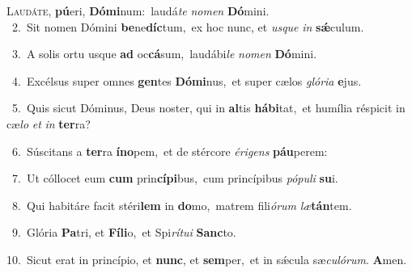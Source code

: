 \lettrine{\initial\textcolor{\initialcolor}{L}}{audáte,} \textbf{pú}\-eri, \textbf{Dó}\-\textbf{mi}num:~\star laudá\textit{te} \textit{no}\-\textit{men} \textbf{Dó}\-mini.\\
{\numbfont\textcolor{\numbcolor}{~2.}}~Sit nomen Dómini \textbf{be}\-ne\-\textbf{díc}\-tum,~\star ex hoc nunc, et \textit{us}\-\textit{que} \textit{in} \textbf{sǽ}\-culum.\par
{\numbfont\textcolor{\numbcolor}{~3.}}~A solis ortu usque \textbf{ad} oc\-\textbf{cá}\-sum,~\star laudábi\textit{le} \textit{no}\-\textit{men} \textbf{Dó}\-mini.\par
{\numbfont\textcolor{\numbcolor}{~4.}}~Excélsus super omnes \textbf{gen}\-tes \textbf{Dó}\-\textbf{mi}nus,~\star et super cælos \textit{gló}\-\textit{ri}\textit{a} \textbf{e}\-jus.\par
{\numbfont\textcolor{\numbcolor}{~5.}}~Quis sicut Dóminus, Deus noster, qui in \textbf{al}\-tis \textbf{há}\-\textbf{bi}tat,~\star et humília réspicit in cæ\textit{lo} \textit{et} \textit{in} \textbf{ter}\-ra?\par
{\numbfont\textcolor{\numbcolor}{~6.}}~Súscitans a \textbf{ter}\-ra \textbf{ín}\-\textbf{o}pem,~\star et de stércore \textit{é}\-\textit{ri}\textit{gens} \textbf{páu}\-perem:\par
{\numbfont\textcolor{\numbcolor}{~7.}}~Ut cóllocet eum \textbf{cum} prin\-\textbf{cí}\-\textbf{pi}bus,~\star cum princípibus \textit{pó}\-\textit{pu}\textit{li} \textbf{su}\-i.\par
{\numbfont\textcolor{\numbcolor}{~8.}}~Qui habitáre facit stéri\textbf{lem} in \textbf{do}\-mo,~\star matrem fili\-\textit{ó}\-\textit{rum} \textit{læ}\-\textbf{tán}tem.\par
{\numbfont\textcolor{\numbcolor}{~9.}}~Glória \textbf{Pa}\-tri, et \textbf{Fí}\-\textbf{li}o,~\star et Spi\-\textit{rí}\-\textit{tu}\textit{i} \textbf{Sanc}\-to.\par
{\numbfont\textcolor{\numbcolor}{10.}}~Sicut erat in princípio, et \textbf{nunc}\-, et \textbf{sem}\-per,~\star et in sǽcula sæ\-\textit{cu}\-\textit{ló}\textit{rum}. \textbf{A}\-men.\par
